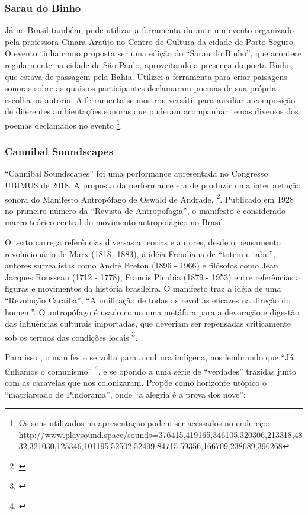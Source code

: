 \subsubsection{Sarau do Binho}

Já no Brasil também, pude utilizar a ferramenta durante um evento organizado pela professora Cinara Araújo no Centro de Cultura da cidade de Porto Seguro. O evento tinha como proposta ser uma edição do ``Sarau do Binho'', que acontece regularmente na cidade de São Paulo, aproveitando a presença do poeta Binho, que estava de passagem pela Bahia. Utilizei a ferramenta para criar paisagens sonoras sobre as quais os participantes declamaram poemas de sua própria escolha ou autoria. A ferramenta se mostrou versátil para auxiliar a composição de diferentes ambientações sonoras que puderam acompanhar temas diversos dos poemas declamados no evento \footnote{Os sons utilizados na apresentação podem ser acessados no endereço: \url{http://www.playsound.space/sounds=376415,419165,346105,320306,213318,4832,321030,125346,101195,52502,52499,84715,59356,166709,238689,396268}}.


\subsubsection{Cannibal Soundscapes}
``Cannibal Soundscapes'' foi uma performance apresentada no Congresso UBIMUS de 2018. A proposta da performance era de produzir uma interpretação sonora do Manifesto Antropófago de Oswald de Andrade, \footnote{\cite{Andrade1928}}. Publicado em 1928 no primeiro número da ``Revista de Antropofagia'', o manifesto é considerado  marco teórico central do movimento antropofágico no Brasil.

O texto carrega referências diversas a teorias e autores, desde o pensamento revolucionário de Marx (1818- 1883), à idéia Freudiana de ``totem e tabu'', autores surrealistas como André Breton (1896 - 1966) e filósofos como Jean Jacques Rousseau (1712 - 1778), Francis Picabia (1879 - 1953) entre referências a figuras e movimentos da história brasileira. O manifesto traz a idéia de uma ``Revolução Caraíba'', ``A unificação de todas as revoltas eficazes na direção do homem''. O antropófago é usado como uma metáfora para a devoração e digestão das influências culturais importadas, que deveriam ser repensadas criticamente sob os termos das condições locais \footnote{\cite{Berg-1999}}.

Para isso , o manifesto se volta para a cultura indígena, nos lembrando que ``Já tínhamos o comunismo'' \footnote{\cite{Bradley2007}}, e se opondo a uma série de ``verdades'' trazidas junto com as caravelas que nos colonizaram. Propõe como horizonte utópico o ``matriarcado de Pindorama'', onde ``a alegria é a prova dos nove'':

